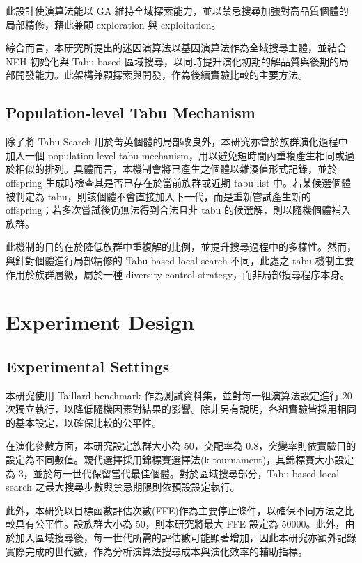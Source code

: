 \documentclass[conference]{IEEEtran}
\begin{document}
此設計使演算法能以 GA 維持全域探索能力，並以禁忌搜尋加強對高品質個體的局部精修，藉此兼顧 exploration 與 exploitation。

綜合而言，本研究所提出的迷因演算法以基因演算法作為全域搜尋主體，並結合 NEH 初始化與 Tabu-based 區域搜尋，以同時提升演化初期的解品質與後期的局部開發能力。此架構兼顧探索與開發，作為後續實驗比較的主要方法。

\subsection{Population-level Tabu Mechanism}

除了將 Tabu Search 用於菁英個體的局部改良外，本研究亦曾於族群演化過程中加入一個 population-level tabu mechanism，用以避免短時間內重複產生相同或過於相似的排列。具體而言，本機制會將已產生之個體以雜湊值形式記錄，並於 offspring 生成時檢查其是否已存在於當前族群或近期 tabu list 中。若某候選個體被判定為 tabu，則該個體不會直接加入下一代，而是重新嘗試產生新的 offspring；若多次嘗試後仍無法得到合法且非 tabu 的候選解，則以隨機個體補入族群。

此機制的目的在於降低族群中重複解的比例，並提升搜尋過程中的多樣性。然而，與針對個體進行局部精修的 Tabu-based local search 不同，此處之 tabu 機制主要作用於族群層級，屬於一種 diversity control strategy，而非局部搜尋程序本身。
\newpage
\section{Experiment Design}
\fontsize{10pt}{12pt}\selectfont

\subsection{Experimental Settings}

本研究使用 Taillard benchmark 作為測試資料集，並對每一組演算法設定進行 20 次獨立執行，以降低隨機因素對結果的影響。除非另有說明，各組實驗皆採用相同的基本設定，以確保比較的公平性。

在演化參數方面，本研究設定族群大小為 50，交配率為 0.8，突變率則依實驗目的設定為不同數值。親代選擇採用錦標賽選擇法(k-tournament)，其錦標賽大小設定為 3，並於每一世代保留當代最佳個體。對於區域搜尋部分，Tabu-based local search 之最大搜尋步數與禁忌期限則依預設設定執行。

此外，本研究以目標函數評估次數(FFE)作為主要停止條件，以確保不同方法之比較具有公平性。設族群大小為 50，則本研究將最大 FFE 設定為 50000。此外，由於加入區域搜尋後，每一世代所需的評估數可能顯著增加，因此本研究亦額外記錄實際完成的世代數，作為分析演算法搜尋成本與演化效率的輔助指標。
\end{document}

